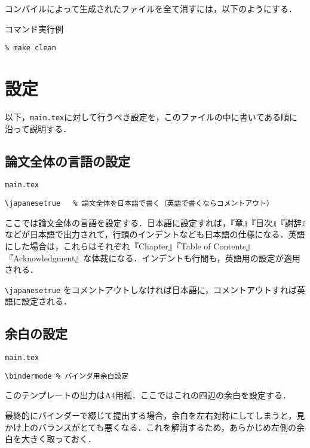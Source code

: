 コンパイルによって生成されたファイルを全て消すには，以下のようにする．

\begin{itembox}[l]{コマンド実行例}
\begin{verbatim}
% make clean
\end{verbatim}
\end{itembox}

\section{設定}

以下，{\tt main.tex}に対して行うべき設定を，このファイルの中に書いてある順に沿って説明する．

\subsection{論文全体の言語の設定}
\label{sec:lang}

\begin{itembox}[l]{{\tt main.tex}}
\begin{verbatim}
\japanesetrue	% 論文全体を日本語で書く（英語で書くならコメントアウト）
\end{verbatim}
\end{itembox}

ここでは論文全体の言語を設定する．日本語に設定すれば，『章』『目次』『謝辞』などが日本語で出力されて，行頭のインデントなども日本語の仕様になる．英語にした場合は，これらはそれぞれ『Chapter』『Table of Contents』『Acknowledgment』な体裁になる．インデントも行間も，英語用の設定が適用される．

\verb|\japanesetrue| をコメントアウトしなければ日本語に，コメントアウトすれば英語に設定される．


\subsection{余白の設定}

\begin{itembox}[l]{{\tt main.tex}}
\begin{verbatim}
\bindermode	% バインダ用余白設定
\end{verbatim}
\end{itembox}

このテンプレートの出力はA4用紙．ここではこれの四辺の余白を設定する．

最終的にバインダーで綴じて提出する場合，余白を左右対称にしてしまうと，見かけ上のバランスがとても悪くなる．これを解消するため，あらかじめ左側の余白を大きく取っておく．

